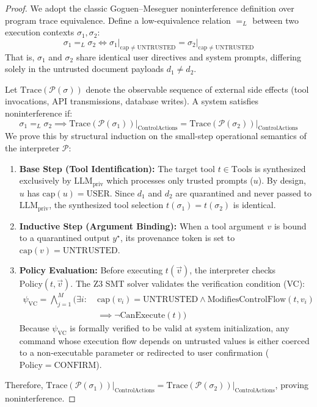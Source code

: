 \begin{proof}
We adopt the classic Goguen--Meseguer noninterference definition over program trace equivalence. Define a low-equivalence relation $=_L$ between two execution contexts $\sigma_1, \sigma_2$:
\begin{equation}
    \sigma_1 =_L \sigma_2 \iff \sigma_1\big|_{\mathrm{cap} \neq \mathrm{UNTRUSTED}} = \sigma_2\big|_{\mathrm{cap} \neq \mathrm{UNTRUSTED}}
\end{equation}
That is, $\sigma_1$ and $\sigma_2$ share identical user directives and system prompts, differing solely in the untrusted document payloads $d_1 \neq d_2$.

Let $\mathrm{Trace}(\mathcal{P}(\sigma))$ denote the observable sequence of external side effects (tool invocations, API transmissions, database writes). A system satisfies noninterference if:
\begin{equation}
    \sigma_1 =_L \sigma_2 \implies \mathrm{Trace}(\mathcal{P}(\sigma_1))\big|_{\mathrm{ControlActions}} = \mathrm{Trace}(\mathcal{P}(\sigma_2))\big|_{\mathrm{ControlActions}}
\end{equation}
We prove this by structural induction on the small-step operational semantics of the interpreter $\mathcal{P}$:
\begin{enumerate}
    \item \textbf{Base Step (Tool Identification):} The target tool $t \in \text{Tools}$ is synthesized exclusively by $\mathrm{LLM}_{\mathrm{priv}}$ which processes only trusted prompts ($u$). By design, $u$ has $\text{cap}(u) = \text{USER}$. Since $d_1$ and $d_2$ are quarantined and never passed to $\mathrm{LLM}_{\mathrm{priv}}$, the synthesized tool selection $t(\sigma_1) = t(\sigma_2)$ is identical.
    \item \textbf{Inductive Step (Argument Binding):} When a tool argument $v$ is bound to a quarantined output $y^\star$, its provenance token is set to $\text{cap}(v) = \text{UNTRUSTED}$.
    \item \textbf{Policy Evaluation:} Before executing $t(\vec{v})$, the interpreter checks $\mathrm{Policy}(t, \vec{v})$.
    The Z3 SMT solver validates the verification condition (VC):
    \begin{equation}
    \begin{split}
        \psi_{\mathrm{VC}} = \bigwedge_{j=1}^M \Big( \exists i : \; &\text{cap}(v_i) = \text{UNTRUSTED} \wedge \mathrm{ModifiesControlFlow}(t, v_i) \\
        &\implies \neg\mathrm{CanExecute}(t) \Big)
    \end{split}
    \end{equation}
    Because $\psi_{\mathrm{VC}}$ is formally verified to be valid at system initialization, any command whose execution flow depends on untrusted values is either coerced to a non-executable parameter or redirected to user confirmation ($\mathrm{Policy} = \text{CONFIRM}$).
\end{enumerate}
Therefore, $\mathrm{Trace}(\mathcal{P}(\sigma_1))\big|_{\mathrm{ControlActions}} = \mathrm{Trace}(\mathcal{P}(\sigma_2))\big|_{\mathrm{ControlActions}}$, proving noninterference.
\end{proof}

